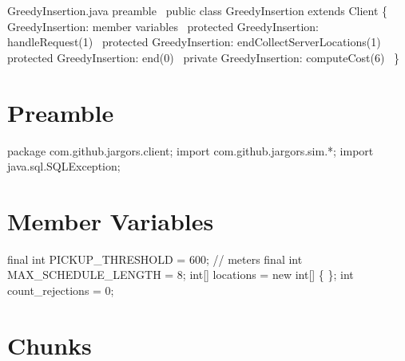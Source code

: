\nwenddocs{}\endmoddef\nwstartdeflinemarkup\nwenddeflinemarkup
\LA{}GreedyInsertion.java preamble~{\nwtagstyle{}}\RA{}
public class GreedyInsertion extends Client \{
  \LA{}GreedyInsertion: member variables~{\nwtagstyle{}}\RA{}
  protected \LA{}GreedyInsertion: handleRequest(1)~{\nwtagstyle{}}\RA{}
  protected \LA{}GreedyInsertion: endCollectServerLocations(1)~{\nwtagstyle{}}\RA{}
  protected \LA{}GreedyInsertion: end(0)~{\nwtagstyle{}}\RA{}
  private \LA{}GreedyInsertion: computeCost(6)~{\nwtagstyle{}}\RA{}
\}
\nwendcode{}\nwdocspar

\section{Preamble}
\nwenddocs{}\endmoddef\nwstartdeflinemarkup{}\nwenddeflinemarkup
package com.github.jargors.client;
import com.github.jargors.sim.*;
import java.sql.SQLException;
\nwendcode{}\nwdocspar

\section{Member Variables}
\nwenddocs{}\endmoddef\nwstartdeflinemarkup{}\nwenddeflinemarkup
final int PICKUP_THRESHOLD = 600;  // meters
final int MAX_SCHEDULE_LENGTH = 8;
int[] locations = new int[] \{ \};
int count_rejections = 0;
\nwendcode{}\nwdocspar

\section{Chunks}

